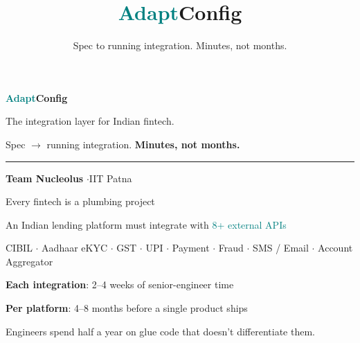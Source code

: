 \documentclass[aspectratio=169,11pt]{beamer}
\title{\textcolor{teal}{Adapt}Config}
\subtitle{Spec to running integration. Minutes, not months.}
\author{}
\institute{}
\date{}
\begin{document}
\begin{frame}[plain]
\vspace{1.4cm}
\begin{center}
{\Huge\bfseries \textcolor{teal}{Adapt}Config}

\vspace{0.6em}
{\Large\color{tp} The integration layer for Indian fintech.}

\vspace{0.3em}
{\large\color{ts} Spec $\to$ running integration. \textbf{Minutes, not months.}}

\vspace{1.2em}
{\color{teal}\rule{6cm}{0.5pt}}

\vspace{0.8em}
{\normalsize\textbf{Team Nucleolus} \quad$\cdot$\quad IIT Patna}
\end{center}
\end{frame}

\begin{frame}{Every fintech is a plumbing project}
\vspace{0.4em}
\begin{center}
{\Large An Indian lending platform must integrate with \textcolor{teal}{8+ external APIs}}
\end{center}

\vspace{0.3em}
\begin{center}
{\small CIBIL $\cdot$ Aadhaar eKYC $\cdot$ GST $\cdot$ UPI $\cdot$ Payment $\cdot$ Fraud $\cdot$ SMS / Email $\cdot$ Account Aggregator}
\end{center}

\vspace{0.8em}
\begin{center}
{\Large \textbf{Each integration}: \textcolor{warn}{2--4 weeks} of senior-engineer time}

\vspace{0.3em}
{\Large \textbf{Per platform}: \textcolor{err}{4--8 months} before a single product ships}
\end{center}

\vspace{0.6em}
\begin{center}
{\small\color{ts} Engineers spend half a year on glue code that doesn't differentiate them.}
\end{center}
\end{frame}
\end{document}
